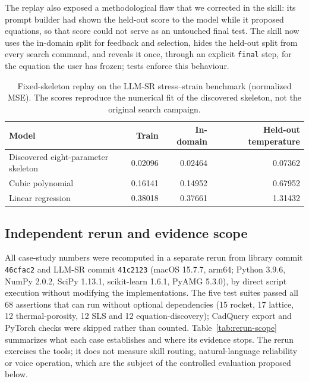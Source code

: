 \documentclass[11pt]{article}
\begin{document}
The replay also exposed a methodological flaw that we corrected in the skill: its prompt builder
had shown the held-out score to the model while it proposed equations, so that score could not
serve as an untouched final test. The skill now uses the in-domain split for feedback and
selection, hides the held-out split from every search command, and reveals it once, through an
explicit \texttt{final} step, for the equation the user has frozen; tests enforce this behaviour.

\begin{table}[t]
\centering\small
\caption{Fixed-skeleton replay on the LLM-SR stress--strain benchmark (normalized MSE). The scores
reproduce the numerical fit of the discovered skeleton, not the original search campaign.}
\label{tab:eq-replay}
\begin{tabular}{lrrr}
\toprule
Model & Train & In-domain & Held-out temperature\\
\midrule
Discovered eight-parameter skeleton & 0.02096 & 0.02464 & 0.07362\\
Cubic polynomial & 0.16141 & 0.14952 & 0.67952\\
Linear regression & 0.38018 & 0.37661 & 1.31432\\
\bottomrule
\end{tabular}
\end{table}

\subsection{Independent rerun and evidence scope}
\label{sec:rerun}
All case-study numbers were recomputed in a separate rerun from library commit \texttt{46cfac2} and
LLM-SR commit \texttt{41c2123} (macOS 15.7.7, arm64; Python 3.9.6, NumPy 2.0.2, SciPy 1.13.1,
scikit-learn 1.6.1, PyAMG 5.3.0), by direct script execution without modifying the implementations.
The five test suites passed all 68 assertions that can run without optional dependencies (15
rocket, 17 lattice, 12 thermal-porosity, 12 SLS and 12 equation-discovery); CadQuery export and
PyTorch checks were skipped rather than counted. Table~\ref{tab:rerun-scope} summarizes what each case
establishes and where its evidence stops. The rerun exercises the tools; it does not measure skill
routing, natural-language reliability or voice operation, which are the subject of the controlled
evaluation proposed below.
\end{document}
